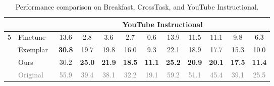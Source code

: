 \begin{table}[!ht]
{\begin{tabular}{clcccccccccc}
&&\multicolumn{10}{c}{YouTube Instructional}\\ \midrule
\multirow{4}{*}{5}& Finetune & 13.6 & 2.8 & 3.6 & 2.7 & 0.6 & 13.9 & 11.5 & 11.1 & 9.8 & 6.3 \\
& Exemplar~\cite{alssum2023just} & \textbf{30.8} & 19.7 & 19.8 & 16.0 & 9.3 & 22.1 & 18.9 & 17.7 & 15.3 & 10.0 \\
& \cellcolor{gray!30}Ours & \cellcolor{gray!30}30.2 & \cellcolor{gray!30}\textbf{25.0} & \cellcolor{gray!30}\textbf{21.9}& \cellcolor{gray!30}\textbf{18.5} & \cellcolor{gray!30}\textbf{11.1} & \cellcolor{gray!30}\textbf{25.2} & \cellcolor{gray!30}\textbf{20.9} & \cellcolor{gray!30}\textbf{20.1} & \cellcolor{gray!30}\textbf{17.5} & \cellcolor{gray!30}\textbf{11.4} \\
&\textcolor{gray}{Original} & \textcolor{gray}{55.9} & \textcolor{gray}{39.4} & \textcolor{gray}{38.1} & \textcolor{gray}{32.2} & \textcolor{gray}{19.1} & \textcolor{gray}{59.2} & \textcolor{gray}{51.1} & \textcolor{gray}{45.4} & \textcolor{gray}{39.1} & \textcolor{gray}{25.5} \\ \bottomrule
\end{tabular}}
\caption{Performance comparison on Breakfast, CrossTask, and YouTube Instructional.%
}
\label{tab:all}
\end{table}